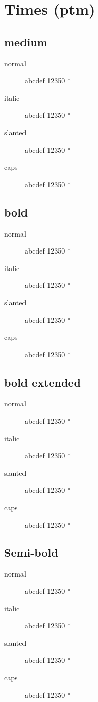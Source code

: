 \section{Times (ptm)}

\subsection{medium}
\begin{description}
    \item [normal]  abcdef 12350 *
    \item [italic]  abcdef 12350 *
    \item [slanted]  abcdef 12350 *
    \item [caps]  abcdef 12350 *
\end{description}
    
\subsection{bold}
\begin{description}
    \item [normal]  abcdef 12350 *
    \item [italic]  abcdef 12350 *
    \item [slanted]  abcdef 12350 *
    \item [caps]  abcdef 12350 *
\end{description}
    
\subsection{bold extended}
\begin{description}
    \item [normal]  abcdef 12350 *
    \item [italic]  abcdef 12350 *
    \item [slanted]  abcdef 12350 *
    \item [caps]  abcdef 12350 *
\end{description}

\subsection{Semi-bold}
\begin{description}
    \item [normal]  abcdef 12350 *
    \item [italic]  abcdef 12350 *
    \item [slanted]  abcdef 12350 *
    \item [caps]  abcdef 12350 *
\end{description}

